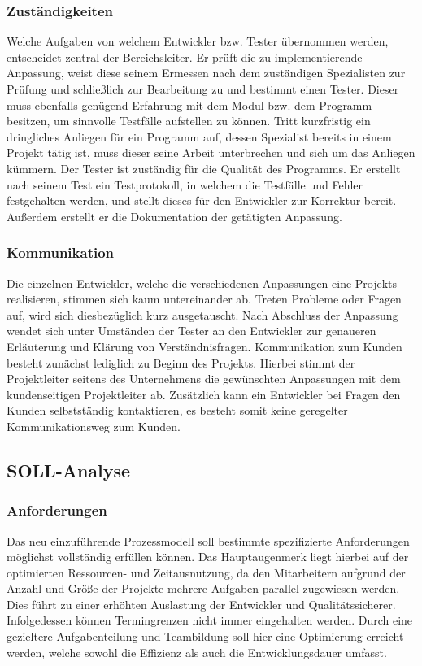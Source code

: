\subsubsection{Zuständigkeiten}
Welche Aufgaben von welchem Entwickler bzw. Tester übernommen werden, entscheidet zentral der Bereichsleiter. Er prüft die zu implementierende Anpassung, weist diese seinem Ermessen nach dem zuständigen Spezialisten zur Prüfung und schließlich zur Bearbeitung zu und bestimmt einen Tester. Dieser muss ebenfalls genügend Erfahrung mit dem Modul bzw. dem Programm besitzen, um sinnvolle Testfälle aufstellen zu können. Tritt kurzfristig ein dringliches Anliegen für ein Programm auf, dessen Spezialist bereits in einem Projekt tätig ist, muss dieser seine Arbeit unterbrechen und sich um das Anliegen kümmern. Der Tester ist zuständig für die Qualität des Programms. Er erstellt nach seinem Test ein Testprotokoll, in welchem die Testfälle und Fehler festgehalten werden, und stellt dieses für den Entwickler zur Korrektur bereit. Außerdem erstellt er die Dokumentation der getätigten Anpassung.

\subsubsection{Kommunikation}
Die einzelnen Entwickler, welche die verschiedenen Anpassungen eine Projekts realisieren, stimmen sich kaum untereinander ab. Treten Probleme oder Fragen auf, wird sich diesbezüglich kurz ausgetauscht. Nach Abschluss der Anpassung wendet sich unter Umständen der Tester an den Entwickler zur genaueren Erläuterung und Klärung von Verständnisfragen. Kommunikation zum Kunden besteht zunächst lediglich zu Beginn des Projekts. Hierbei stimmt der Projektleiter seitens des Unternehmens die gewünschten Anpassungen mit dem kundenseitigen Projektleiter ab. Zusätzlich kann ein Entwickler bei Fragen den Kunden selbstständig kontaktieren, es besteht somit keine geregelter Kommunikationsweg zum Kunden.

\subsection{SOLL-Analyse}
\subsubsection{Anforderungen}
Das neu einzuführende Prozessmodell soll bestimmte spezifizierte Anforderungen möglichst vollständig erfüllen können. Das Hauptaugenmerk liegt hierbei auf der optimierten Ressourcen- und Zeitausnutzung, da den Mitarbeitern aufgrund der Anzahl und Größe der Projekte mehrere Aufgaben parallel zugewiesen werden. Dies führt zu einer erhöhten Auslastung der Entwickler und Qualitätssicherer. Infolgedessen können Termingrenzen nicht immer eingehalten werden. Durch eine gezieltere Aufgabenteilung und Teambildung soll hier eine Optimierung erreicht werden, welche sowohl die Effizienz als auch die Entwicklungsdauer umfasst.

